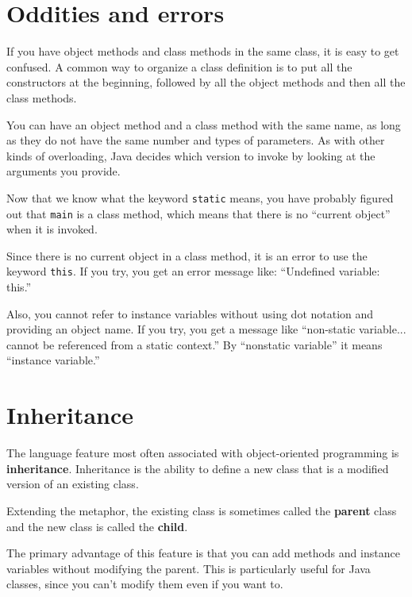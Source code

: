 \documentclass[12pt]{book}
\theoremstyle{definition}
\begin{document}
\section{Oddities and errors}

If you have object methods and class methods in the same class, it is
easy to get confused.  A common way to organize a class definition is
to put all the constructors at the beginning, followed by all the
object methods and then all the class methods.

You can have an object method and a class method with the same
name, as long as they do not have the same number and types of
parameters.  As with other kinds of overloading, Java decides
which version to invoke by looking at the arguments you provide.

Now that we know what the keyword {\tt static} means, you
have probably figured out that {\tt main} is a class method,
which means that there is no ``current object'' when it is invoked.

Since there is no current object in a class method, it is an
error to use the keyword {\tt this}.  If you try, you get
an error message like: ``Undefined variable: this.''

Also, you cannot refer to instance variables without using dot
notation and providing an object name.  If you try, you get a message
like ``non-static variable... cannot be referenced from a static
context.''  By ``nonstatic variable'' it means ``instance variable.''


\section{Inheritance}

The language feature most often associated with
object-oriented programming is {\bf inheritance}.  Inheritance is the
ability to define a new class that is a modified version of an
existing class.

Extending the metaphor, the existing
class is sometimes called the {\bf parent} class and the new
class is called the {\bf child}.

The primary advantage of this feature is that you can add methods
and instance variables without modifying the
parent.  This is particularly useful for Java classes,
since you can't modify them even if you want to.
\end{document}

